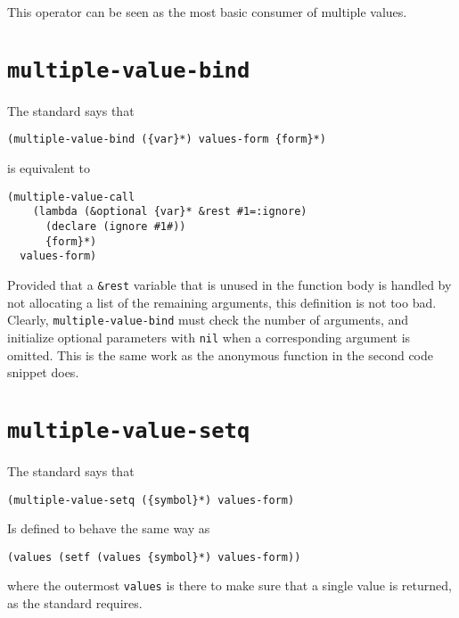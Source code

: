 This operator can be seen as the most basic consumer of multiple
values.

\section{\texttt{multiple-value-bind}}

The standard says that

\begin{verbatim}
(multiple-value-bind ({var}*) values-form {form}*)
\end{verbatim}

is equivalent to

\begin{verbatim}
(multiple-value-call
    (lambda (&optional {var}* &rest #1=:ignore)
      (declare (ignore #1#))
      {form}*)
  values-form)
\end{verbatim}

Provided that a \texttt{\&rest} variable that is unused in the
function body is handled by not allocating a list of the remaining
arguments, this definition is not too bad.  Clearly,
\texttt{multiple-value-bind} must check the number of arguments, and
initialize optional parameters with \texttt{nil} when a corresponding
argument is omitted.  This is the same work as the anonymous function
in the second code snippet does.

\section{\texttt{multiple-value-setq}}

The standard says that

\begin{verbatim}
(multiple-value-setq ({symbol}*) values-form)
\end{verbatim}

Is defined to behave the same way as

\begin{verbatim}
(values (setf (values {symbol}*) values-form))
\end{verbatim}

where the outermost \texttt{values} is there to make sure that a
single value is returned, as the standard requires. 

